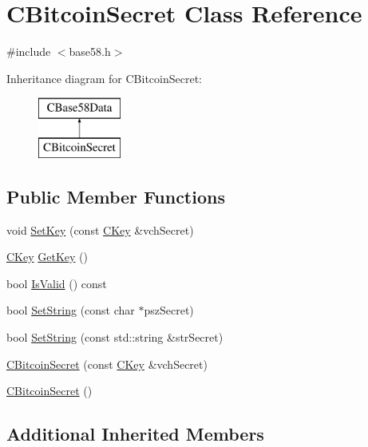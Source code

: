 \hypertarget{class_c_bitcoin_secret}{}\section{C\+Bitcoin\+Secret Class Reference}
\label{class_c_bitcoin_secret}


{\ttfamily \#include $<$base58.\+h$>$}

Inheritance diagram for C\+Bitcoin\+Secret\+:\begin{figure}[H]
\begin{center}
\leavevmode
\includegraphics[height=2.000000cm]{class_c_bitcoin_secret}
\end{center}
\end{figure}
\subsection*{Public Member Functions}
\begin{DoxyCompactItemize}
\item 
void \mbox{\hyperlink{class_c_bitcoin_secret_a3629c0fce320664c3c07cb082939d6ec}{Set\+Key}} (const \mbox{\hyperlink{class_c_key}{C\+Key}} \&vch\+Secret)
\item 
\mbox{\hyperlink{class_c_key}{C\+Key}} \mbox{\hyperlink{class_c_bitcoin_secret_a4d6bf559d092e6d47f8001c7171096df}{Get\+Key}} ()
\item 
bool \mbox{\hyperlink{class_c_bitcoin_secret_a2a93fa8a09826ff63498cb3e4370c154}{Is\+Valid}} () const
\item 
bool \mbox{\hyperlink{class_c_bitcoin_secret_a6a8aff02f66099f33f573ad3e6375bb1}{Set\+String}} (const char $\ast$psz\+Secret)
\item 
bool \mbox{\hyperlink{class_c_bitcoin_secret_a83cfc3b34aac494efdd6e316cd08626d}{Set\+String}} (const std\+::string \&str\+Secret)
\item 
\mbox{\hyperlink{class_c_bitcoin_secret_a0358baa459a1f22661b601d9d83eacf8}{C\+Bitcoin\+Secret}} (const \mbox{\hyperlink{class_c_key}{C\+Key}} \&vch\+Secret)
\item 
\mbox{\hyperlink{class_c_bitcoin_secret_a3b6168eef2ab8c44d60272e62162fd5b}{C\+Bitcoin\+Secret}} ()
\end{DoxyCompactItemize}
\subsection*{Additional Inherited Members}


